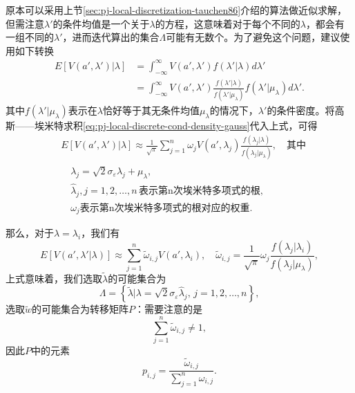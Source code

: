 \begin{subappendices}
原本可以采用上节\ref{sec:pj-local-discretization-tauchen86}介绍的\cite{Tauchen:1986gi}算法做近似求解，但需注意$\lambda'$的条件均值是一个关于$\lambda$的方程，这意味着对于每个不同的$\lambda$，都会有一组不同的$\lambda'$，进而迭代算出的集合$\Lambda$可能有无数个。为了避免这个问题，\cite{Tauchen:1991iv}建议使用如下转换
\begin{equation*}
\begin{split}
    E\left[ V(a', \lambda') | \lambda \right] &= \int_{-\infty}^{\infty} V(a',\lambda') f(\lambda' | \lambda) d \lambda'\\
    &= \int_{-\infty}^{\infty} V(a',\lambda') \frac{
    f(\lambda' | \lambda)
    }{f(\lambda' | \mu_{\lambda})}
    f(\lambda' | \mu_{\lambda}) d \lambda'.
\end{split}
\end{equation*}
其中$f(\lambda' | \mu_{\lambda})$表示在$\lambda$恰好等于其无条件均值$\mu_{\lambda}$的情况下，$\lambda'$的条件密度。将高斯——埃米特求积\eqref{eq:pj-local-discrete-cond-density-gauss}代入上式，可得
\begin{equation}
  \label{eq:pj-local-discrete-th1991-mid}
  \begin{split}
    &E\left[ V(a', \lambda') | \lambda \right] \approx
    \frac{1}{\sqrt{\pi}} \sum_{j=1}^{n} \omega_j V(a', \lambda_j) \frac{f(\lambda_j | \lambda)}{f(\lambda_j | \mu_{\lambda})}, \quad \text{其中} \\
    & \quad \lambda_j = \sqrt{2} \sigma_{\varepsilon} \hat{\lambda}_j + \mu_{\lambda}, \\
    & \quad \hat{\lambda}_j, j=1,2,\ldots,n \, \text{表示第n次埃米特多项式的根}, \\
    & \quad \omega_j \text{表示第n次埃米特多项式的根对应的权重}.
  \end{split}
\end{equation}

那么，对于$\lambda = \lambda_i$，我们有
\begin{equation}
  \label{eq:pj-local-discrete-th1991-midd}
  E \left[ V(a', \lambda' | \lambda) \right] \approx \sum_{j=1}^{n} \tilde{\omega}_{i,j} V(a', \lambda_i), \quad \tilde{\omega}_{i,j}= \frac{1}{\sqrt{\pi}} \omega_j \frac{
  f(\lambda_j | \lambda_i)
  }{
  f(\lambda_j | \mu_{\lambda})
  },
\end{equation}
上式意味着，我们选取$\tilde{\lambda}$的可能集合为
\begin{equation*}
  \Lambda = \left\{ \tilde{\lambda} | \lambda = \sqrt{2} \sigma_{\varepsilon} \hat{\lambda}_j, \, j=1,2,\ldots,n \right\},
\end{equation*}
选取$\tilde{w}$的可能集合为转移矩阵$P$：需要注意的是
\begin{equation*}
  \sum_{j=1}^{n} \tilde{\omega}_{i,j} \neq 1,
\end{equation*}
因此$P$中的元素
\begin{equation*}
  p_{i,j} = \frac{
  \tilde{\omega}_{i,j}
  }{
  \sum_{j=1}^{n} \omega_{i,j}
  }.
\end{equation*}


\end{subappendices}
